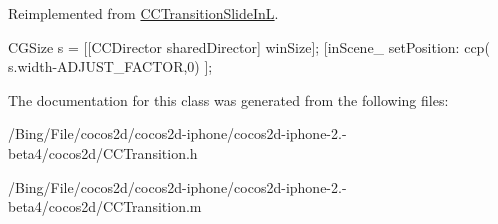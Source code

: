 Reimplemented from \hyperlink{interface_c_c_transition_slide_in_l_a1040ca9a5abc535c40d8a1a5fd23f03c}{C\-C\-Transition\-Slide\-In\-L}.


\begin{DoxyCode}
{
        CGSize s = [[CCDirector sharedDirector] winSize];
        [inScene_ setPosition: ccp( s.width-ADJUST_FACTOR,0) ];
}
\end{DoxyCode}


The documentation for this class was generated from the following files\-:\begin{DoxyCompactItemize}
\item 
/\-Bing/\-File/cocos2d/cocos2d-\/iphone/cocos2d-\/iphone-\/2.-\/beta4/cocos2d/C\-C\-Transition.\-h\item 
/\-Bing/\-File/cocos2d/cocos2d-\/iphone/cocos2d-\/iphone-\/2.-\/beta4/cocos2d/C\-C\-Transition.\-m\end{DoxyCompactItemize}
